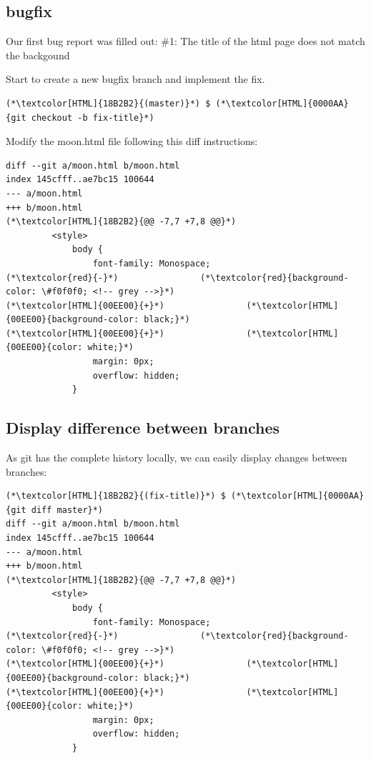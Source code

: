 \subsection{bugfix}
\begin{frame}[fragile]
    \subslidetitle

Our first bug report was filled out:
\newline \vspace{1em}
\#1: The title of the html page does not match the backgound

Start to create a new bugfix branch and implement the fix.
\begin{lstlisting}
(*\textcolor[HTML]{18B2B2}{(master)}*) $ (*\textcolor[HTML]{0000AA}{git checkout -b fix-title}*)
\end{lstlisting}

Modify the moon.html file following this diff instructions:
\begin{lstlisting}
diff --git a/moon.html b/moon.html
index 145cfff..ae7bc15 100644
--- a/moon.html
+++ b/moon.html
(*\textcolor[HTML]{18B2B2}{@@ -7,7 +7,8 @@}*)
         <style>
             body {
                 font-family: Monospace;
(*\textcolor{red}{-}*)                (*\textcolor{red}{background-color: \#f0f0f0; <!-- grey -->}*)
(*\textcolor[HTML]{00EE00}{+}*)                (*\textcolor[HTML]{00EE00}{background-color: black;}*)
(*\textcolor[HTML]{00EE00}{+}*)                (*\textcolor[HTML]{00EE00}{color: white;}*)
                 margin: 0px;
                 overflow: hidden;
             }
\end{lstlisting}
\end{frame}

\subsection{Display difference between branches}
\begin{frame}[fragile]
    \subslidetitle

As git has the complete history locally, we can easily display changes between branches:

\begin{lstlisting}
(*\textcolor[HTML]{18B2B2}{(fix-title)}*) $ (*\textcolor[HTML]{0000AA}{git diff master}*)
diff --git a/moon.html b/moon.html
index 145cfff..ae7bc15 100644
--- a/moon.html
+++ b/moon.html
(*\textcolor[HTML]{18B2B2}{@@ -7,7 +7,8 @@}*)
         <style>
             body {
                 font-family: Monospace;
(*\textcolor{red}{-}*)                (*\textcolor{red}{background-color: \#f0f0f0; <!-- grey -->}*)
(*\textcolor[HTML]{00EE00}{+}*)                (*\textcolor[HTML]{00EE00}{background-color: black;}*)
(*\textcolor[HTML]{00EE00}{+}*)                (*\textcolor[HTML]{00EE00}{color: white;}*)
                 margin: 0px;
                 overflow: hidden;
             }
\end{lstlisting}
\end{frame}

